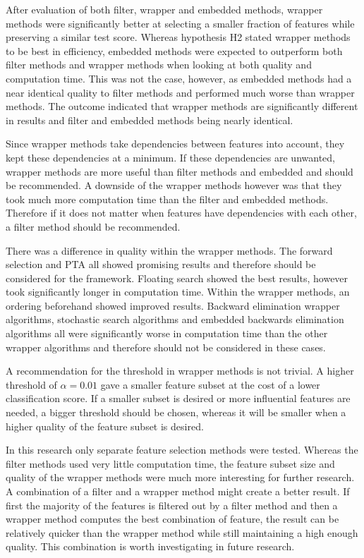 \documentclass[10pt,a4paper]{report}
\begin{document}
	After evaluation of both filter, wrapper and embedded methods, wrapper methods were significantly better at selecting a smaller fraction of features while preserving a similar test score.  Whereas hypothesis H2 stated wrapper methods to be best in efficiency, embedded methods were expected to outperform both filter methods and wrapper methods when looking at both quality and computation time. This was not the case, however, as embedded methods had a near identical quality to filter methods and performed much worse than wrapper methods. The outcome indicated that wrapper methods are significantly different in results and filter and embedded methods being nearly identical.
	
	Since wrapper methods take dependencies between features into account, they kept these dependencies at a minimum. If these dependencies are unwanted, wrapper methods are more useful than filter methods and embedded and should be recommended. A downside of the wrapper methods however was that they took much more computation time than the filter and embedded methods. Therefore if it does not matter when features have dependencies with each other, a filter method should be recommended.
	
	There was a difference in quality within the wrapper methods. The forward selection and PTA all showed promising results and therefore should be considered for the framework. Floating search showed the best results, however took significantly longer in computation time. Within the wrapper methods, an ordering beforehand showed improved results. Backward elimination wrapper algorithms, stochastic search algorithms and embedded backwards elimination algorithms all were significantly worse in computation time than the other wrapper algorithms and therefore should not be considered in these cases.
	
	A recommendation for the threshold in wrapper methods is not trivial. A higher threshold of $\alpha = 0.01$ gave a smaller feature subset at the cost of a lower classification score. If a smaller subset is desired or more influential features are needed, a bigger threshold should be chosen, whereas it will be smaller when a higher quality of the feature subset is desired.
	
	In this research only separate feature selection methods were tested. Whereas the filter methods used very little computation time, the feature subset size and quality of the wrapper methods were much more interesting for further research. A combination of a filter and a wrapper method might create a better result. If first the majority of the features is filtered out by a filter method and then a wrapper method computes the best combination of feature, the result can be relatively quicker than the wrapper method while still maintaining a high enough quality. This combination is worth investigating in future research.
	
\end{document}

